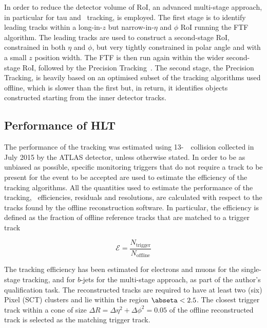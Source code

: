 			In order to reduce the detector volume of \ac{RoI}, an advanced multi-stage approach, in particular for tau and \bj\ tracking, is employed. The first stage is to identify leading tracks within a long-in-$z$ but narrow-in-$\eta$ and $\phi$ \ac{RoI} running the \ac{FTF} algorithm. The leading tracks are used to construct a second-stage \ac{RoI}, constrained in both $\eta$ and $\phi$, but very tightly constrained in polar angle and with a small $z$ position width. The \ac{FTF} is then run again within the wider second-stage \ac{RoI}, followed by the Precision Tracking~\cite{ATLASTrigger2015, Miano:2016oty}. The second stage, the Precision Tracking, is heavily based on an optimised subset of the tracking algorithms used offline, which is slower than the first but, in return, it identifies objects constructed starting from the inner detector tracks.





		\subsection{Performance of HLT}
		\label{sec:Trig_perf}

			The performance of the tracking was estimated using 13-\TeV\ \pp\ collision collected in July 2015 by the \ac{ATLAS} detector, unless otherwise stated. In order to be as unbiased as possible, specific monitoring triggers that do not require a track to be present for the event to be accepted are used to estimate the efficiency of the tracking algorithms. All the quantities used to estimate the performance of the tracking, \ie\ efficiencies, residuals and resolutions, are calculated with respect to the tracks found by the offline reconstruction software. In particular, the efficiency is defined as the fraction of offline reference tracks that are matched to a trigger track 

			\begin{equation}
				\mathcal{E} = \frac{N_{\mathrm{trigger}}}{N_{\mathrm{offline}}}
				\label{eq:trig_eff}
			\end{equation}

			The tracking efficiency has been estimated for electrons and muons for the single-stage tracking, and for $b$-jets for the multi-stage approach, as part of the author's qualification task. The reconstructed tracks are required to have at least two (six) Pixel (\ac{SCT}) clusters and lie within the region $\abseta < 2.5$. The closest trigger track within a cone of size $\Delta R =  \Delta \eta^2 + \Delta \phi^2 = 0.05$ of the offline reconstructed track is selected as the matching trigger track.


